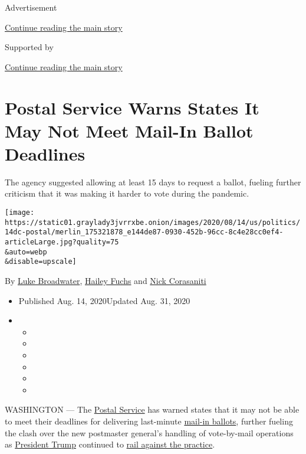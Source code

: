 Advertisement

\protect\hyperlink{after-top}{Continue reading the main story}

Supported by

\protect\hyperlink{after-sponsor}{Continue reading the main story}

\hypertarget{postal-service-warns-states-it-may-not-meet-mail-in-ballot-deadlines}{%
\section{Postal Service Warns States It May Not Meet Mail-In Ballot
Deadlines}\label{postal-service-warns-states-it-may-not-meet-mail-in-ballot-deadlines}}

The agency suggested allowing at least 15 days to request a ballot,
fueling further criticism that it was making it harder to vote during
the pandemic.

\texttt{[image: https://static01.graylady3jvrrxbe.onion/images/2020/08/14/us/politics/14dc-postal/merlin\_175321878\_e144de87-0930-452b-96cc-8c4e28cc0ef4-articleLarge.jpg?quality=75\\\&auto=webp\\\&disable=upscale]}

By \href{https://www.nytimes3xbfgragh.onion/by/luke-broadwater}{Luke
Broadwater},
\href{https://www.nytimes3xbfgragh.onion/by/hailey-fuchs}{Hailey Fuchs}
and \href{https://www.nytimes3xbfgragh.onion/by/nick-corasaniti}{Nick
Corasaniti}

\begin{itemize}
\item
  Published Aug. 14, 2020Updated Aug. 31, 2020
\item
  \begin{itemize}
  \item
  \item
  \item
  \item
  \item
  \item
  \end{itemize}
\end{itemize}

WASHINGTON --- The
\href{https://www.nytimes3xbfgragh.onion/2020/08/18/us/politics/postal-service-suspends-changes.html}{Postal
Service} has warned states that it may not be able to meet their
deadlines for delivering last-minute
\href{https://www.nytimes3xbfgragh.onion/interactive/2020/08/31/us/politics/vote-by-mail-deadlines.html}{mail-in
ballots}, further fueling the clash over the new postmaster general's
handling of vote-by-mail operations as
\href{https://www.nytimes3xbfgragh.onion/2020/08/18/us/politics/postal-service-suspends-changes.html}{President
Trump} continued to
\href{https://www.nytimes3xbfgragh.onion/2020/08/13/us/politics/trump-postal-service-mail-voting.html}{rail
against the practice}.


